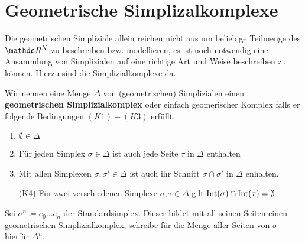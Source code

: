 
\section{Geometrische Simplizalkomplexe}

Die geometrischen Simpliziale allein reichen nicht aus um beliebige
Teilmenge des $\R^N$ zu beschreiben bzw. modellieren, es ist noch
notwendig eine Ansammlung von Simplizialen auf eine richtige Art und
Weise beschreiben zu können. Hierzu sind die Simplizialkomplexe da.

\begin{Def}
  Wir nennen eine Menge $\Delta$ von (geometrischen) Simplizialen
  einen \textbf{geometrischen Simplizialkomplex} oder einfach
  geomerischer Komplex falls er folgende Bedingungen $(K1) - (K3)$
  erfüllt.
  \begin{enumerate}[(K1)]
  \item $\emptyset \in \Delta$
  \item Für jeden Simplex $\sigma \in \Delta$ ist auch jede Seite
    $\tau$ in $\Delta$ enthalten
  \item Mit allen Simplexen $\sigma, \sigma' \in \Delta$ ist auch ihr
    Schnitt $\sigma \cap \sigma'$ in $\Delta$ enhalten.
  \item[(K4)] Für zwei verschiedenen Simplexe $\sigma,\tau \in \Delta$
    gilt $\operatorname{Int}(\sigma) \cap \operatorname{Int}(\tau) = \emptyset$
  \end{enumerate}
\end{Def}


\begin{Bsp}
  Sei $\sigma^n \coloneqq e_0 \ldots e_n $ der Standardsimplex.
  Dieser bildet mit all seinen Seiten einen geometrischen
  Simplizialkomplex, schreibe für die Menge aller Seiten von $\sigma$
  hierfür $\Delta^n$.
\end{Bsp}


